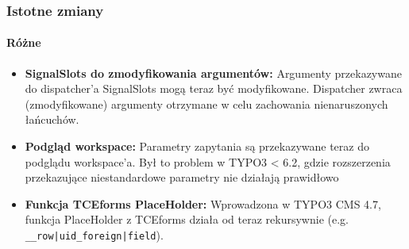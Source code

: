 \begin{frame}[fragile]
	\frametitle{Istotne zmiany}
	\framesubtitle{Różne}

	\begin{itemize}

		\item \textbf{SignalSlots do zmodyfikowania argumentów:}\newline
			\small
				Argumenty przekazywane do dispatcher'a SignalSlots mogą teraz być modyfikowane. Dispatcher zwraca (zmodyfikowane) argumenty otrzymane w celu zachowania nienaruszonych łańcuchów.
			\normalsize

		\item \textbf{Podgląd workspace:}\newline
			\small
				Parametry zapytania są przekazywane teraz do podglądu workspace'a. Był to problem w TYPO3 < 6.2, gdzie rozszerzenia przekazujące niestandardowe parametry nie działają prawidłowo
			\normalsize

		\item \textbf{Funkcja TCEforms PlaceHolder:}\newline
			\small
				Wprowadzona w TYPO3 CMS 4.7, funkcja PlaceHolder z TCEforms działa od teraz rekursywnie (e.g. \texttt{\_\_row|uid\_foreign|field}).
			\normalsize

	\end{itemize}
	
\end{frame}


